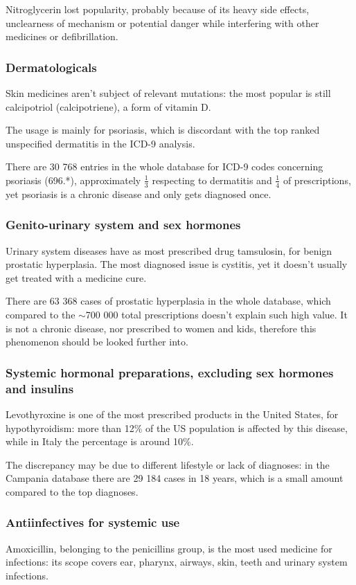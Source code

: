 Nitroglycerin lost popularity, probably because of its heavy side effects, unclearness of mechanism or potential danger while interfering with other medicines or defibrillation. 

\subsubsection{Dermatologicals}
Skin medicines aren't subject of relevant mutations: the most popular is still calcipotriol (calcipotriene), a form of vitamin D.

The usage is mainly for psoriasis, which is discordant with the top ranked unspecified dermatitis in the ICD-9 analysis.

There are 30 768 entries in the whole database for ICD-9 codes concerning psoriasis (696.*), approximately $\frac{1}{3}$ respecting to dermatitis and $\frac{1}{4}$ of prescriptions, yet psoriasis is a chronic disease and only gets diagnosed once.

\subsubsection{Genito-urinary system and sex hormones}
Urinary system diseases have as most prescribed drug tamsulosin, for benign prostatic hyperplasia. The most diagnosed issue is cystitis, yet it doesn't usually get treated with a medicine cure.

There are 63 368 cases of prostatic hyperplasia in the whole database, which compared to the $\sim$700 000 total prescriptions doesn't explain such high value. It is not a chronic disease, nor prescribed to women and kids, therefore this phenomenon should be looked further into.

\subsubsection{Systemic hormonal preparations, excluding sex hormones and insulins}
Levothyroxine is one of the most prescribed products in the United States, for hypothyroidism: more than 12\% of the US population is affected by this disease, while in Italy the percentage is around 10\%.

The discrepancy may be due to different lifestyle or lack of diagnoses: in the Campania database there are 29 184 cases in 18 years, which is a small amount compared to the top diagnoses.

\subsubsection{Antiinfectives for systemic use}
Amoxicillin, belonging to the penicillins group, is the most used medicine for infections: its scope covers ear, pharynx, airways, skin, teeth and urinary system infections.

